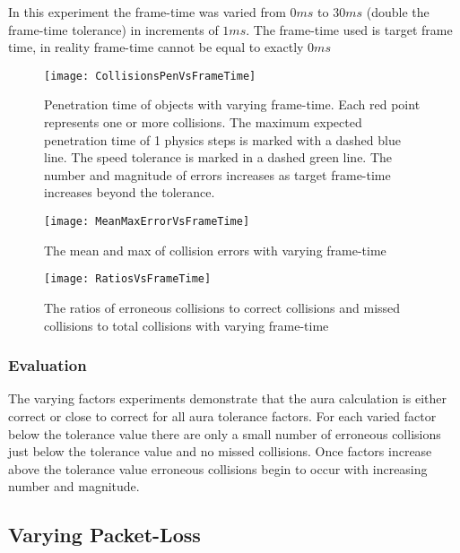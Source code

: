 In this experiment the frame-time was varied from $0ms$ to $30ms$ (double the frame-time tolerance) in increments of $1ms$.
The frame-time used is target frame time, in reality frame-time cannot be equal to exactly $0ms$

\begin{figure}
\centering
\texttt{[image: CollisionsPenVsFrameTime]}
\caption{Penetration time of objects with varying frame-time. Each red point represents one or more collisions. The maximum expected penetration time of 1 physics steps is marked with a dashed blue line. The speed tolerance is marked in a dashed green line. The number and magnitude of errors increases as target frame-time increases beyond the tolerance.}
\label{fig_CollisionsPenVsFrameTime}
\end{figure}

\begin{figure}
\centering
\texttt{[image: MeanMaxErrorVsFrameTime]}
\caption{The mean and max of collision errors with varying frame-time}
\label{fig_MeanMaxErrorVsFrameTime}
\end{figure}

\begin{figure}
\centering
\texttt{[image: RatiosVsFrameTime]}
\caption{The ratios of erroneous collisions to correct collisions and missed collisions to total collisions with varying frame-time}
\label{fig_RatiosVsFrameTime}
\end{figure}

\subsubsection{Evaluation}
The varying factors experiments demonstrate that the aura calculation is either correct or close to correct for all aura tolerance factors. For each varied factor below the tolerance value there are only a small number of erroneous collisions just below the tolerance value and no missed collisions. Once factors increase above the tolerance value erroneous collisions begin to occur with increasing number and magnitude.


\subsection{Varying Packet-Loss}

